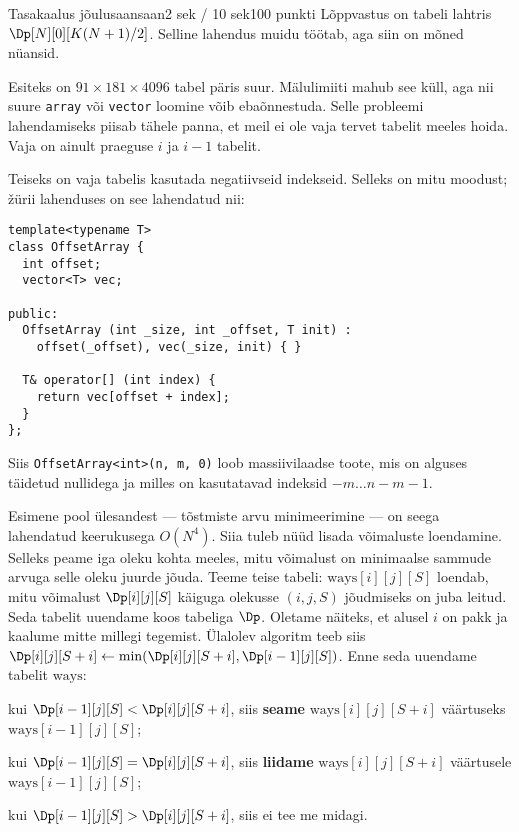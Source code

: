 \begin{yl}{6}{Tasakaalus jõulusaan}{saan}{2 sek / 10 sek}{100 punkti}
  Lõppvastus on tabeli lahtris $\Dp[N][0][K (N + 1) / 2]$. Selline lahendus muidu töötab,
  aga siin on mõned nüansid.

  Esiteks on $91 \times 181 \times 4096$ tabel päris suur. Mälulimiiti mahub see küll, aga
  nii suure \texttt{array} või \texttt{vector} loomine võib ebaõnnestuda. Selle probleemi
  lahendamiseks piisab tähele panna, et meil ei ole vaja tervet tabelit meeles hoida.
  Vaja on ainult praeguse $i$ ja $i - 1$ tabelit.

  Teiseks on vaja tabelis kasutada negatiivseid indekseid. Selleks on mitu moodust; žürii
  lahenduses on see lahendatud nii:
  \begin{lstlisting}
template<typename T>
class OffsetArray {
  int offset;
  vector<T> vec;

public:
  OffsetArray (int _size, int _offset, T init) :
    offset(_offset), vec(_size, init) { }

  T& operator[] (int index) {
    return vec[offset + index];
  }
};
  \end{lstlisting}
  Siis \texttt{OffsetArray<int>(n, m, 0)} loob massiivilaadse toote, mis on alguses täidetud
  nullidega ja milles on kasutatavad indeksid $-m \ldots n - m - 1$.

  Esimene pool ülesandest --- tõstmiste arvu minimeerimine --- on seega lahendatud keerukusega $O(N^4)$.
  Siia tuleb nüüd lisada võimaluste loendamine. Selleks peame iga oleku kohta meeles,
  mitu võimalust on minimaalse sammude arvuga selle oleku juurde jõuda. Teeme teise tabeli:
  $\mathrm{ways}[i][j][S]$ loendab, mitu võimalust $\Dp[i][j][S]$ käiguga olekusse $(i, j, S)$
  jõudmiseks on juba leitud.
  Seda tabelit uuendame koos tabeliga $\Dp$. Oletame näiteks, et alusel $i$ on pakk ja kaalume mitte
  millegi tegemist. Ülalolev algoritm teeb siis
  $\Dp[i][j][S + i] \gets \min(\Dp[i][j][S + i], \Dp[i - 1][j][S])$. Enne seda uuendame tabelit
  $\mathrm{ways}$:
  \begin{xitem}
  \item kui $\Dp[i - 1][j][S] < \Dp[i][j][S + i]$, siis \textbf{seame} $\mathrm{ways}[i][j][S + i]$
    väärtuseks $\mathrm{ways}[i - 1][j][S]$;
  \item kui $\Dp[i - 1][j][S] = \Dp[i][j][S + i]$, siis \textbf{liidame} $\mathrm{ways}[i][j][S + i]$
    väärtusele $\mathrm{ways}[i - 1][j][S]$;
  \item kui $\Dp[i - 1][j][S] > \Dp[i][j][S + i]$, siis ei tee me midagi.
  \end{xitem}
\end{yl}
